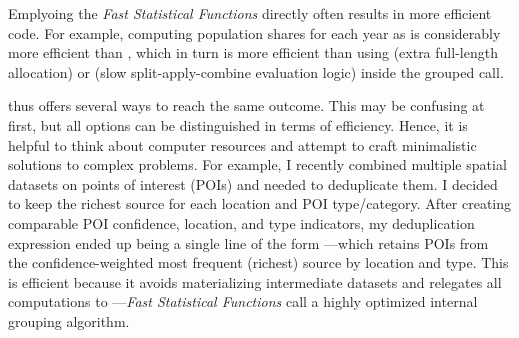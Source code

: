 \documentclass[article]{jss} %
\newcommand{\fct}[1]{\code{#1()}}
\begin{document}
Emplyoing the \emph{Fast Statistical Functions} directly often results in more efficient code. For example, computing population shares for each year as  is considerably more efficient than , which in turn is more efficient than using  (extra full-length allocation) or  (slow split-apply-combine evaluation logic) inside the grouped \fct{fmutate} call. \newline

 thus offers several ways to reach the same outcome. This may be confusing at first, but all options can be distinguished in terms of efficiency. Hence, it is helpful to think about computer resources and attempt to craft minimalistic solutions to complex problems. For example, I recently combined multiple spatial datasets on points of interest (POIs) and needed to deduplicate them. I decided to keep the richest source for each location and POI type/category. After creating comparable POI confidence, location, and type indicators, my deduplication expression ended up being a single line of the form ---which retains POIs from the confidence-weighted most frequent (richest) source by location and type. This is efficient because it avoids materializing intermediate datasets and relegates all computations to \fct{fmode}---\emph{Fast Statistical Functions} call a highly optimized internal grouping algorithm.
%
\end{document}
